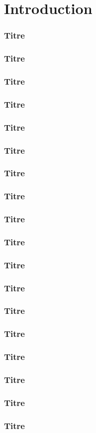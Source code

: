 \section{Introduction}
\label{sec:introduction}

\begin{frame} \frametitle{Titre} \end{frame}
\begin{frame} \frametitle{Titre} \end{frame}
\begin{frame} \frametitle{Titre} \end{frame}
\begin{frame} \frametitle{Titre} \end{frame}
\begin{frame} \frametitle{Titre} \end{frame}
\begin{frame} \frametitle{Titre} \end{frame}
\begin{frame} \frametitle{Titre} \end{frame}
\begin{frame} \frametitle{Titre} \end{frame}
\begin{frame} \frametitle{Titre} \end{frame}
\begin{frame} \frametitle{Titre} \end{frame}
\begin{frame} \frametitle{Titre} \end{frame}
\begin{frame} \frametitle{Titre} \end{frame}
\begin{frame} \frametitle{Titre} \end{frame}
\begin{frame} \frametitle{Titre} \end{frame}
\begin{frame} \frametitle{Titre} \end{frame}
\begin{frame} \frametitle{Titre} \end{frame}
\begin{frame} \frametitle{Titre} \end{frame}
\begin{frame} \frametitle{Titre} \end{frame}
